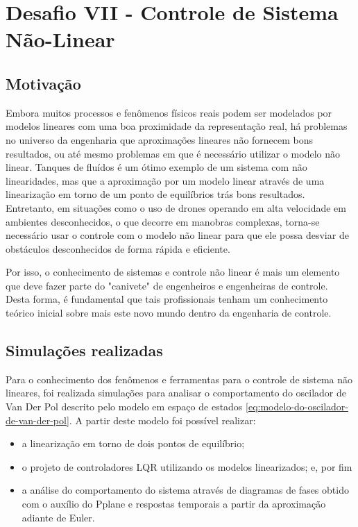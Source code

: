 \newcommand{\mat}[1]{\MakeUppercase{\mathbf{#1}}}
\newcommand{\ssvec}[1]{\MakeLowercase{\mathbf{#1}}}
\newcommand{\ssveceq}[1]{\MakeLowercase{\mathbf{\bar{#1}}}}
\newcommand{\peqone}{\ensuremath{[1 \thickspace 0]^\top}}
\newcommand{\peqtwo}{\ensuremath{[4 \thickspace 0]^\top}}
\newcommand{\inicond}{\ensuremath{\ssvec{x}(0) = [-5 \thickspace -5]}}

\section{Desafio VII - Controle de Sistema Não-Linear} 

\subsection{Motivação}
Embora muitos processos e fenômenos físicos reais podem ser modelados por
modelos lineares com uma boa proximidade da representação real, há problemas no
universo da engenharia que aproximações lineares não fornecem bons resultados,
ou até mesmo problemas em que é necessário utilizar o modelo não linear. Tanques
de fluídos é um ótimo exemplo de um sistema com não linearidades, mas que a
aproximação por um modelo linear através de uma linearização em torno de um
ponto de equilíbrios trás bons resultados. Entretanto, em situações como o uso
de drones operando em alta velocidade em ambientes desconhecidos, o que decorre
em manobras complexas, torna-se necessário usar o controle com o modelo não
linear para que ele possa desviar de obstáculos desconhecidos de forma rápida e
eficiente.

Por isso, o conhecimento de sistemas e controle não linear é mais um elemento
que deve fazer parte do "canivete" de engenheiros e engenheiras de controle.
Desta forma, é fundamental que tais profissionais tenham um conhecimento teórico
inicial sobre mais este novo mundo dentro da engenharia de controle.

\subsection{Simulações realizadas}

Para o conhecimento dos fenômenos e ferramentas para o controle de sistema não
lineares, foi realizada simulações para analisar o comportamento do oscilador de
Van Der Pol descrito pelo modelo em espaço de estados
\ref{eq:modelo-do-oscilador-de-van-der-pol}. A partir deste modelo foi possível
realizar:

\begin{itemize}
    \item a linearização em torno de dois pontos de equilíbrio;
    \item o projeto de controladores LQR utilizando os modelos linearizados; e,
    por fim
    \item a análise do comportamento do sistema através de diagramas de fases
    obtido com o auxílio do Pplane e respostas temporais a partir da aproximação
    adiante de Euler.
\end{itemize}

